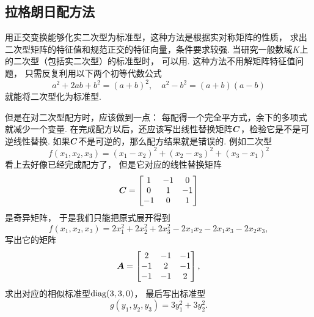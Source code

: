 \subsection{拉格朗日配方法}
用正交变换能够化实二次型为标准型，这种方法是根据实对称矩阵的性质，
求出二次型矩阵的特征值和规范正交的特征向量，条件要求较强.
当研究一般数域\(K\)上的二次型（包括实二次型）的标准型时，
可以用.
这种方法不用解矩阵特征值问题，
只需反复利用以下两个初等代数公式\[
	a^2+2ab+b^2=(a+b)^2,
	\quad
	a^2-b^2=(a+b)(a-b)
\]就能将二次型化为标准型.

但是在对二次型配方时，应该做到一点：
每配得一个完全平方式，余下的多项式就减少一个变量.
在完成配方以后，还应该写出线性替换矩阵\(\boldsymbol{C}\)，检验它是不是可逆线性替换.
如果\(\boldsymbol{C}\)不是可逆的，那么配方结果就是错误的.
例如二次型\[
	f(x_1,x_2,x_3) = (x_1-x_2)^2 + (x_2-x_3)^2 + (x_3-x_1)^2
\]看上去好像已经完成配方了，
但是它对应的线性替换矩阵\[
	\boldsymbol{C} = \begin{bmatrix}
		1 & -1 & 0 \\
		0 & 1 & -1 \\
		-1 & 0 & 1 \\
	\end{bmatrix}
\]是奇异矩阵，
于是我们只能把原式展开得到\[
	f(x_1,x_2,x_3)
	= 2 x_1^2 + 2 x_2^2 + 2 x_3^2
	- 2 x_1 x_2 - 2 x_1 x_3 - 2 x_2 x_3,
\]
写出它的矩阵\[
	\boldsymbol{A} = \begin{bmatrix}
		2 & -1 & -1 \\
		-1 & 2 & -1 \\
		-1 & -1 & 2
	\end{bmatrix},
\]
求出对应的相似标准型\(\operatorname{diag}(3,3,0)\)，
最后写出标准型\[
	g(y_1,y_2,y_3) = 3 y_1^2 + 3 y_2^2.
\]

